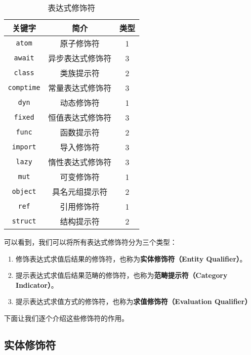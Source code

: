 \begin{table}[!ht]
    \centering
    \begin{tabular}{|c|c|c|} \hline
        关键字 & 简介 & 类型 \\\hline
        \lstinline!atom!        & 原子修饰符         & 1 \\\hline
        \lstinline!await!		& 异步表达式修饰符		& 3 \\\hline
        \lstinline!class!       & 类族提示符         & 2 \\\hline
        \lstinline!comptime!    & 常量表达式修饰符    & 3 \\\hline
        \lstinline!dyn!         & 动态修饰符         & 1 \\\hline
        \lstinline!fixed!		& 恒值表达式修饰符		& 3 \\\hline
        \lstinline!func!        & 函数提示符         & 2 \\\hline
        \lstinline!import!		& 导入修饰符			& 3 \\\hline
        \lstinline!lazy!        & 惰性表达式修饰符    & 3 \\\hline
        \lstinline!mut!         & 可变修饰符         & 1 \\\hline
        \lstinline!object!      & 具名元组提示符      & 2 \\\hline
        \lstinline!ref!         & 引用修饰符         & 1 \\\hline
        \lstinline!struct!      & 结构提示符         & 2 \\\hline
    \end{tabular}
    \caption{表达式修饰符}
    \label{tab:expression-qualifier}
\end{table}

可以看到，我们可以将所有表达式修饰符分为三个类型：

\begin{enumerate}
    \item 修饰表达式求值后结果的修饰符，也称为\textbf{实体修饰符（Entity Qualifier）}。

    \item 提示表达式求值后结果范畴的修饰符，也称为\textbf{范畴提示符（Category Indicator）}。

    \item 提示表达式求值方式的修饰符，也称为\textbf{求值修饰符（Evaluation Qualifier）}
\end{enumerate}

下面让我们逐个介绍这些修饰符的作用。

\subsection{实体修饰符}

